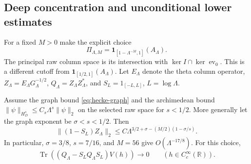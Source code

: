 \subsection{Deep concentration and unconditional lower estimates}

For a fixed $M>0$ make the explicit choice
\[
 \Pi_{\Lambda,M}
       =\mathbf1_{[1-\Lambda^{-M},1]}(A_\Lambda).
\]
The principal raw column space is its intersection with
$\ker I\cap\ker\operatorname{ev}_0$.  This is a different cutoff
from $\mathbf1_{[1/2,1]}(A_\Lambda)$.  Let $E_\Lambda$ denote the
theta column operator, $Z_\Lambda=E_\Lambda G_\Lambda^{-1/2}$,
$Q_\Lambda=Z_\Lambda Z_\Lambda^*$, and
$S_L=1_{[-L,L]}$, $L=\log\Lambda$.

\begin{theorem}
\label{thm:hecke-deep-leakage}
Assume the graph bound \eqref{eq:hecke-graph} and the archimedean
bound $\|\psi\|_{H_D^s}\leq C_s\Lambda^s\|\psi\|_2$ on the
selected raw space for $s<1/2$.  More generally let the graph exponent
be $\sigma<s<1/2$.  Then
\begin{equation}\label{eq:hecke-deep-leakage}
 \|(1-S_L)Z_\Lambda\|_2
 \leq C\Lambda^{3/2+\sigma-(M/2)(1-\sigma/s)}.
\end{equation}
In particular, $\sigma=3/8$, $s=7/16$, and $M=56$ give
$O(\Lambda^{-17/8})$.  For this choice,
\[
 \operatorname{Tr}((Q_\Lambda-S_LQ_\Lambda S_L)V(h))\longrightarrow0
 \qquad(h\in C_c^\infty(\mathbb R)).
\]
\end{theorem}

